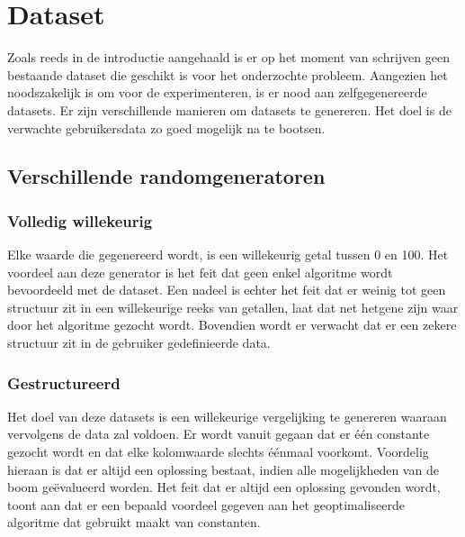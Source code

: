 \documentclass[Main.tex]{subfiles}
\begin{document}
\section{Dataset}

Zoals reeds in de introductie aangehaald is er op het moment van schrijven geen bestaande dataset die geschikt is voor het onderzochte probleem. Aangezien het noodszakelijk is om voor de experimenteren, is er nood aan zelfgegenereerde datasets. Er zijn verschillende manieren om datasets te genereren. Het doel is de verwachte gebruikersdata zo goed mogelijk na te bootsen.
  
\subsection{Verschillende randomgeneratoren}
\subsubsection*{Volledig willekeurig}
Elke waarde die gegenereerd wordt, is een willekeurig getal tussen 0 en 100. Het voordeel aan deze generator is het feit dat geen enkel algoritme wordt bevoordeeld met de dataset. Een nadeel is echter het feit dat er weinig tot geen structuur zit in een willekeurige reeks van getallen, laat dat net hetgene zijn waar door het algoritme gezocht wordt. Bovendien wordt er verwacht dat er een zekere structuur zit in de gebruiker gedefinieerde data.

\subsubsection*{Gestructureerd}
Het doel van deze datasets is een willekeurige vergelijking te genereren waaraan vervolgens de data zal voldoen. Er wordt vanuit gegaan dat er \'e\'en constante gezocht wordt en dat elke kolomwaarde slechts \'e\'enmaal voorkomt. Voordelig hieraan is dat er altijd een oplossing bestaat, indien alle mogelijkheden van de boom ge\"evalueerd worden. Het feit dat er altijd een oplossing gevonden wordt, toont aan dat er een bepaald voordeel gegeven aan het geoptimaliseerde algoritme dat gebruikt maakt van constanten.
\end{document}
